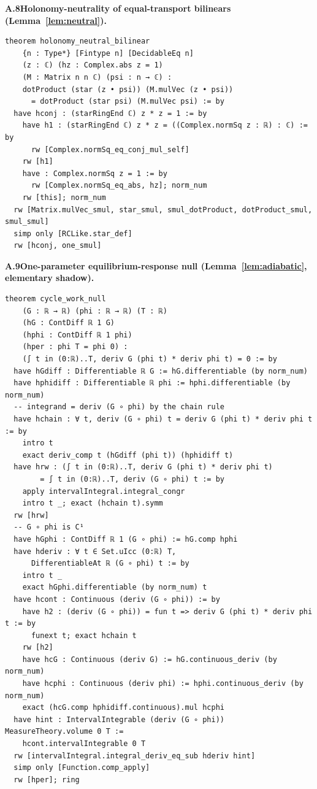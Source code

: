 \medskip \noindent\textbf{A.8\quad Holonomy-neutrality of equal-transport bilinears (Lemma~\ref{lem:neutral}).}
\begin{verbatim}
theorem holonomy_neutral_bilinear
    {n : Type*} [Fintype n] [DecidableEq n]
    (z : ℂ) (hz : Complex.abs z = 1)
    (M : Matrix n n ℂ) (psi : n → ℂ) :
    dotProduct (star (z • psi)) (M.mulVec (z • psi))
      = dotProduct (star psi) (M.mulVec psi) := by
  have hconj : (starRingEnd ℂ) z * z = 1 := by
    have h1 : (starRingEnd ℂ) z * z = ((Complex.normSq z : ℝ) : ℂ) := by
      rw [Complex.normSq_eq_conj_mul_self]
    rw [h1]
    have : Complex.normSq z = 1 := by
      rw [Complex.normSq_eq_abs, hz]; norm_num
    rw [this]; norm_num
  rw [Matrix.mulVec_smul, star_smul, smul_dotProduct, dotProduct_smul, smul_smul]
  simp only [RCLike.star_def]
  rw [hconj, one_smul]
\end{verbatim}

\medskip \noindent\textbf{A.9\quad One-parameter equilibrium-response null (Lemma~\ref{lem:adiabatic}, elementary shadow).}
\begin{verbatim}
theorem cycle_work_null
    (G : ℝ → ℝ) (phi : ℝ → ℝ) (T : ℝ)
    (hG : ContDiff ℝ 1 G)
    (hphi : ContDiff ℝ 1 phi)
    (hper : phi T = phi 0) :
    (∫ t in (0:ℝ)..T, deriv G (phi t) * deriv phi t) = 0 := by
  have hGdiff : Differentiable ℝ G := hG.differentiable (by norm_num)
  have hphidiff : Differentiable ℝ phi := hphi.differentiable (by norm_num)
  -- integrand = deriv (G ∘ phi) by the chain rule
  have hchain : ∀ t, deriv (G ∘ phi) t = deriv G (phi t) * deriv phi t := by
    intro t
    exact deriv_comp t (hGdiff (phi t)) (hphidiff t)
  have hrw : (∫ t in (0:ℝ)..T, deriv G (phi t) * deriv phi t)
        = ∫ t in (0:ℝ)..T, deriv (G ∘ phi) t := by
    apply intervalIntegral.integral_congr
    intro t _; exact (hchain t).symm
  rw [hrw]
  -- G ∘ phi is C¹
  have hGphi : ContDiff ℝ 1 (G ∘ phi) := hG.comp hphi
  have hderiv : ∀ t ∈ Set.uIcc (0:ℝ) T,
      DifferentiableAt ℝ (G ∘ phi) t := by
    intro t _
    exact hGphi.differentiable (by norm_num) t
  have hcont : Continuous (deriv (G ∘ phi)) := by
    have h2 : (deriv (G ∘ phi)) = fun t => deriv G (phi t) * deriv phi t := by
      funext t; exact hchain t
    rw [h2]
    have hcG : Continuous (deriv G) := hG.continuous_deriv (by norm_num)
    have hcphi : Continuous (deriv phi) := hphi.continuous_deriv (by norm_num)
    exact (hcG.comp hphidiff.continuous).mul hcphi
  have hint : IntervalIntegrable (deriv (G ∘ phi)) MeasureTheory.volume 0 T :=
    hcont.intervalIntegrable 0 T
  rw [intervalIntegral.integral_deriv_eq_sub hderiv hint]
  simp only [Function.comp_apply]
  rw [hper]; ring
\end{verbatim}

